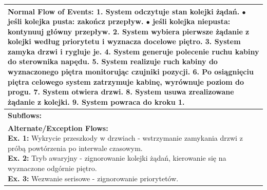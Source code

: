 \documentclass[12pt,a4paper]{article}
\begin{document}
\begin{table}[h!]
\begin{tabular}{|p{}|p{}|p{}|}
\multicolumn{3}{|p{0.9\textwidth}|}{\textbf{Normal Flow of Events:} \newline
1. System odczytuje stan kolejki żądań. \newline
\hspace*{10pt} $\bullet$ jeśli kolejka pusta: zakończ przepływ. \newline
\hspace*{10pt} $\bullet$ jeśli kolejka niepusta: kontynuuj główny przepływ. \newline
2. System wybiera pierwsze żądanie z kolejki według priorytetu i wyznacza docelowe piętro. \newline
3. System zamyka drzwi i rygluje je. \newline
4. System generuje polecenie ruchu kabiny do sterownika napędu. \newline
5. System realizuje ruch kabiny do wyznaczonego piętra monitorując czujniki pozycji. \newline
6. Po osiągnięciu piętra celowego system zatrzymuje kabinę, wyrównuje poziom do progu. \newline
7. System otwiera drzwi. \newline
8. System usuwa zrealizowane żądanie z kolejki. \newline
9. System powraca do kroku 1.} \\ \hline
\multicolumn{3}{|p{0.9\textwidth}|}{\textbf{Subflows:} } \\ \hline
\multicolumn{3}{|p{0.9\textwidth}|}{\textbf{Alternate/Exception Flows:} \newline
\textbf{Ex. 1:} Wykrycie przeszkody w drzwiach - wstrzymanie zamykania drzwi z próbą powtórzenia po interwale czasowym. \newline
\textbf{Ex. 2:} Tryb awaryjny - zignorowanie kolejki żądań, kierowanie się na wyznaczone odgórnie piętro. \newline
\textbf{Ex. 3:} Wezwanie serisowe - zignorowanie priorytetów.} \\ \hline

\end{tabular}
\end{table}
\newpage
\end{document}
